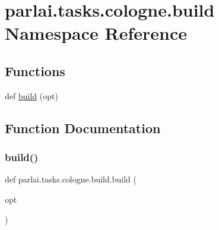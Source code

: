 \hypertarget{namespaceparlai_1_1tasks_1_1cologne_1_1build}{}\section{parlai.\+tasks.\+cologne.\+build Namespace Reference}
\label{namespaceparlai_1_1tasks_1_1cologne_1_1build}
\subsection*{Functions}
\begin{DoxyCompactItemize}
\item 
def \hyperlink{namespaceparlai_1_1tasks_1_1cologne_1_1build_a7aa62cb182d58231bd6f495e4054b6c1}{build} (opt)
\end{DoxyCompactItemize}


\subsection{Function Documentation}
\mbox{\label{namespaceparlai_1_1tasks_1_1cologne_1_1build_a7aa62cb182d58231bd6f495e4054b6c1}} 
\subsubsection{\texorpdfstring{build()}{build()}}
{\footnotesize\ttfamily def parlai.\+tasks.\+cologne.\+build.\+build (\begin{DoxyParamCaption}\item[{}]{opt }\end{DoxyParamCaption})}


